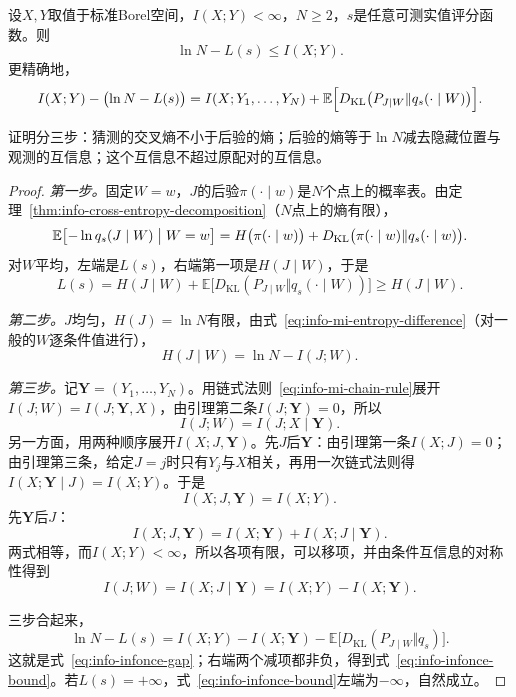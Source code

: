 \begin{theorem}[InfoNCE下界]
\label{thm:info-infonce}
设$X,Y$取值于标准Borel空间，$I(X;Y)<\infty$，$N\geq2$，$s$是任意可测实值评分函数。则
\begin{equation}
  \ln N-L(s)\leq I(X;Y).
  \label{eq:info-infonce-bound}
\end{equation}
更精确地，
\begin{equation}
  I(X;Y)-\bigl(\ln N-L(s)\bigr)=I(X;Y_1,\dots,Y_N)+\mathbb{E}\Bigl[D_{\mathrm{KL}}\bigl(P_{J\mid W}\Vert q_s(\cdot\mid W)\bigr)\Bigr].
  \label{eq:info-infonce-gap}
\end{equation}
\end{theorem}

证明分三步：猜测的交叉熵不小于后验的熵；后验的熵等于$\ln N$减去隐藏位置与观测的互信息；这个互信息不超过原配对的互信息。

\begin{proof}
\emph{第一步。}固定$W=w$，$J$的后验$\pi(\cdot\mid w)$是$N$个点上的概率表。由定理~\ref{thm:info-cross-entropy-decomposition}（$N$点上的熵有限），
\[
  \mathbb{E}\bigl[-\ln q_s(J\mid W)\bigm|W=w\bigr]=H\bigl(\pi(\cdot\mid w)\bigr)+D_{\mathrm{KL}}\bigl(\pi(\cdot\mid w)\Vert q_s(\cdot\mid w)\bigr).
\]
对$W$平均，左端是$L(s)$，右端第一项是$H(J\mid W)$，于是
\[
  L(s)=H(J\mid W)+\mathbb{E}\bigl[D_{\mathrm{KL}}(P_{J\mid W}\Vert q_s(\cdot\mid W))\bigr]\geq H(J\mid W).
\]

\emph{第二步。}$J$均匀，$H(J)=\ln N$有限，由式~\eqref{eq:info-mi-entropy-difference}（对一般的$W$逐条件值进行），
\[
  H(J\mid W)=\ln N-I(J;W).
\]

\emph{第三步。}记$\bm{Y}=(Y_1,\dots,Y_N)$。用链式法则~\eqref{eq:info-mi-chain-rule}展开$I(J;W)=I(J;\bm{Y},X)$，由引理第二条$I(J;\bm{Y})=0$，所以
\[
  I(J;W)=I(J;X\mid\bm{Y}).
\]
另一方面，用两种顺序展开$I(X;J,\bm{Y})$。先$J$后$\bm{Y}$：由引理第一条$I(X;J)=0$；由引理第三条，给定$J=j$时只有$Y_j$与$X$相关，再用一次链式法则得$I(X;\bm{Y}\mid J)=I(X;Y)$。于是
\[
  I(X;J,\bm{Y})=I(X;Y).
\]
先$\bm{Y}$后$J$：
\[
  I(X;J,\bm{Y})=I(X;\bm{Y})+I(X;J\mid\bm{Y}).
\]
两式相等，而$I(X;Y)<\infty$，所以各项有限，可以移项，并由条件互信息的对称性得到
\[
  I(J;W)=I(X;J\mid\bm{Y})=I(X;Y)-I(X;\bm{Y}).
\]

三步合起来，
\[
  \ln N-L(s)=I(X;Y)-I(X;\bm{Y})-\mathbb{E}\bigl[D_{\mathrm{KL}}(P_{J\mid W}\Vert q_s)\bigr].
\]
这就是式~\eqref{eq:info-infonce-gap}；右端两个减项都非负，得到式~\eqref{eq:info-infonce-bound}。若$L(s)=+\infty$，式~\eqref{eq:info-infonce-bound}左端为$-\infty$，自然成立。
\end{proof}

